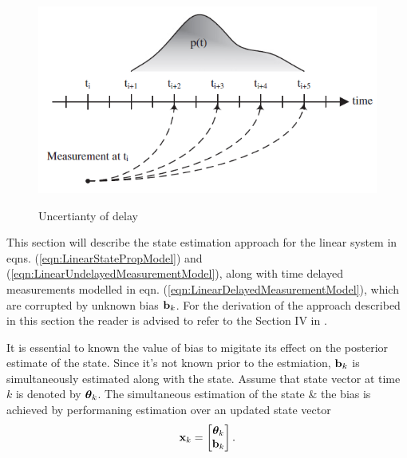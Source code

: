 \begin{figure}
	{\includegraphics[width=1.0\columnwidth]{./img/delay_uncertainty.png}}
	\caption{Uncertianty of delay}
	\label{fig:delay_uncertainty}
\end{figure}

This section will describe the state estimation approach for the linear system in eqns. (\ref{eqn:LinearStatePropModel}) and (\ref{eqn:LinearUndelayedMeasurementModel}), along with time delayed measurements modelled in eqn. (\ref{eqn:LinearDelayedMeasurementModel}), which are corrupted by unknown bias $\mathbf{b}_k$. 
For the derivation of the approach described in this section the reader is advised to refer to the Section IV in \cite{choi2012state}.

It is essential to known the value of bias to migitate its effect on the posterior estimate of the state. Since it's not known prior to the estmiation, $\mathbf{b}_k$ is simultaneously estimated along with the state. 
Assume that state vector at time $k$ is denoted by $\boldsymbol{\theta}_k$.
The simultaneous estimation of the state \& the bias is achieved by performaning estimation over an updated state vector 
\begin{equation}
	\mathbf{x}_k =
	\begin{bmatrix}
		\boldsymbol{\theta}_k \\ \mathbf{b}_k
	\end{bmatrix}. 
\end{equation}

